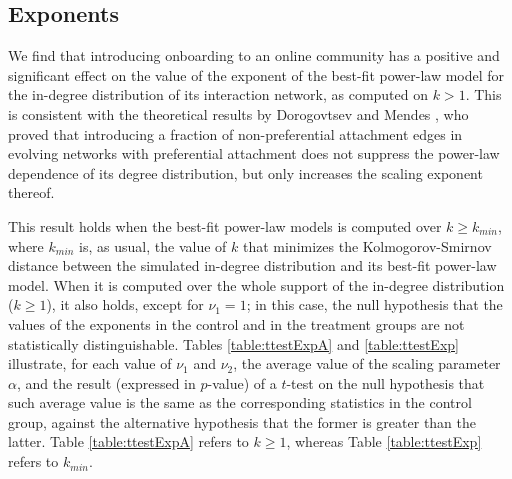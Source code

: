 \documentclass{article}
\begin{document}
\subsection{Exponents} \label{ssec:exponents}
We find that introducing onboarding to an online community has a positive and significant effect on the value of the exponent of the best-fit power-law model for the in-degree distribution of its interaction network, as computed on $k > 1$. This is consistent with the theoretical results by Dorogovtsev and Mendes \cite{dorogovtsev2002evolution}, who proved that introducing a fraction of non-preferential attachment edges in evolving networks with preferential attachment does not suppress the power-law dependence of its degree distribution, but only increases the scaling exponent thereof. 

This result holds when the best-fit power-law models is computed over $k \geq k_{min}$, where $k_{min}$ is, as usual, the value of $k$ that minimizes the Kolmogorov-Smirnov distance between the simulated in-degree distribution and its best-fit power-law model. When it is computed over the whole support of the in-degree distribution ($k \geq  1$), it also holds, except for $\nu_1 = 1$; in this case, the null hypothesis that the values of the exponents in the control and in the treatment groups are not statistically distinguishable. Tables \ref {table:ttestExpA} and \ref {table:ttestExp} illustrate, for each value of  $\nu_1$ and $\nu_2$, the average value of the scaling parameter $\alpha$, and the result (expressed in $p$-value) of a $t$-test on the null hypothesis that such average value is the same as the corresponding statistics in the control group, against the alternative hypothesis that the former is greater than the latter. Table \ref{table:ttestExpA} refers to $k \geq  1$, whereas Table \ref{table:ttestExp} refers to $k_{min}$.
\end{document}
